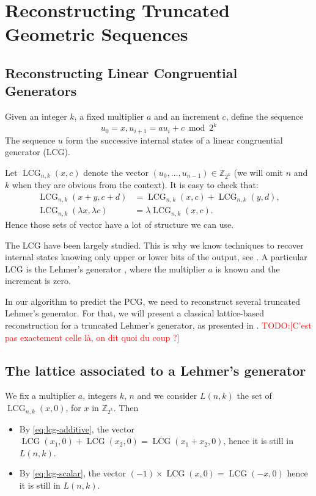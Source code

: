 \documentclass[preprint,svgnames]{iacrtrans}
\DeclareMathOperator{\LCG}{LCG}
\newcommand{\todo}[1]{\textcolor{red}{TODO:[#1]}}
\begin{document}
\section{Reconstructing Truncated Geometric Sequences}
\label{sec:geometric}

\subsection{Reconstructing Linear Congruential Generators}

Given an integer \(k\), a fixed multiplier \(a\) and an increment \(c\), define the
sequence \[u_0 = x, u_{i+1} = a u_i + c \bmod 2^k\] The sequence \(u\) form the
successive internal states of a linear congruential generator (LCG). 

Let $\LCG_{n,k}(x, c)$ denote the vector $(u_0, \dots, u_{n-1}) \in \mathbb{Z}_{2^k}$ (we will omit $n$ and $k$ when they are obvious from the context).  It is easy to check that:
\begin{align}
\label{eq:lcg-additive}
\LCG_{n,k}(x + y, c + d) &= \LCG_{n,k}(x, c) + \LCG_{n,k}(y, d),  \\
\label{eq:lcg-scalar}
\LCG_{n,k}(\lambda x, \lambda c) &= \lambda \LCG_{n,k}(x, c).   
\end{align}
Hence those sets of vector have a lot of structure we can use.

The LCG have been largely studied. This is why we know techniques to recover internal states knowing only upper or lower bits of the output, see \cite{Boyar1989}. A particular LCG is the Lehmer's generator \cite{Lehmer}, where the multiplier \(a\) is known and the increment is zero.

In our algorithm to predict the PCG, we need to reconstruct several truncated Lehmer's generator. For that, we will present a classical lattice-based reconstruction for a truncated Lehmer's generator, as presented in \cite{Frieze}. \todo{C'est pas exactement celle là, on dit quoi du coup ?}

\subsection{The lattice associated to a Lehmer's generator}

We fix a multiplier \(a\), integers \(k\), \(n\) and we consider \(L(n,k)\) the set of \(\LCG_{n,k}(x, 0)\), for \(x\) in \(\mathbb{Z}_{2^k}\). Then

\begin{itemize}
	\item By \ref{eq:lcg-additive}, the vector \(\LCG(x_1,0) + \LCG(x_2,0) = \LCG(x_1+x_2,0)\), hence it is still in \(L(n,k)\).
	\item By \ref{eq:lcg-scalar}, the vector \((-1)\times \LCG(x,0) = \LCG(-x,0)\) hence it is still in \(L(n,k)\).
\end{itemize}
\end{document}
